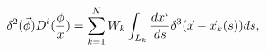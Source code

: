 \begin{equation}
\delta ^2(\vec{\phi})D^i(\frac \phi x)=\sum_{k=1}^NW_k\int_{L_k}\frac{dx^i}{%
ds}\delta ^3(\vec{x}-\vec{x}_k(s))ds,  \label{jitopcurr}
\end{equation}

